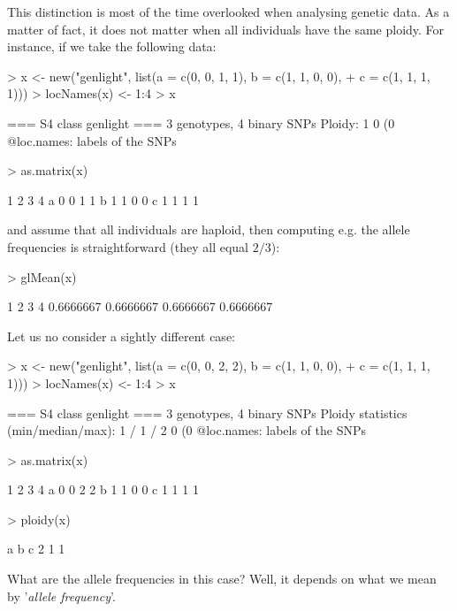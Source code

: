 \documentclass{article}
\begin{document}
This distinction is most of the time overlooked when analysing genetic data.
As a matter of fact, it does not matter when all individuals have the same ploidy.
For instance, if we take the following data:
\begin{Schunk}
\begin{Sinput}
> x <- new("genlight", list(a = c(0, 0, 1, 1), b = c(1, 1, 0, 0), 
+     c = c(1, 1, 1, 1)))
> locNames(x) <- 1:4
> x
\end{Sinput}
\begin{Soutput}
 === S4 class genlight ===
 3 genotypes,  4 binary SNPs
 Ploidy: 1
 0 (0 %
 @loc.names: labels of the SNPs
\end{Soutput}
\begin{Sinput}
> as.matrix(x)
\end{Sinput}
\begin{Soutput}
  1 2 3 4
a 0 0 1 1
b 1 1 0 0
c 1 1 1 1
\end{Soutput}
\end{Schunk}
and assume that all individuals are haploid, then computing e.g. the allele frequencies is
straightforward (they all equal $2/3$):
\begin{Schunk}
\begin{Sinput}
> glMean(x)
\end{Sinput}
\begin{Soutput}
        1         2         3         4 
0.6666667 0.6666667 0.6666667 0.6666667 
\end{Soutput}
\end{Schunk}
Let us no consider a sightly different case:
\begin{Schunk}
\begin{Sinput}
> x <- new("genlight", list(a = c(0, 0, 2, 2), b = c(1, 1, 0, 0), 
+     c = c(1, 1, 1, 1)))
> locNames(x) <- 1:4
> x
\end{Sinput}
\begin{Soutput}
 === S4 class genlight ===
 3 genotypes,  4 binary SNPs
 Ploidy statistics (min/median/max): 1 / 1 / 2
 0 (0 %
 @loc.names: labels of the SNPs
\end{Soutput}
\begin{Sinput}
> as.matrix(x)
\end{Sinput}
\begin{Soutput}
  1 2 3 4
a 0 0 2 2
b 1 1 0 0
c 1 1 1 1
\end{Soutput}
\begin{Sinput}
> ploidy(x)
\end{Sinput}
\begin{Soutput}
a b c 
2 1 1 
\end{Soutput}
\end{Schunk}
What are the allele frequencies in this case?
Well, it depends on what we mean by '\textit{allele frequency}'.
\\
\end{document}
